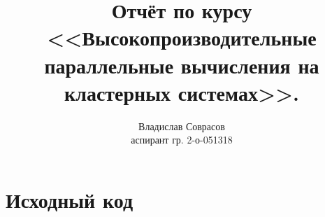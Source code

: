 \documentclass[a4paper]{article}
\begin{document}
\title{Отчёт по курсу <<Высокопроизводительные параллельные вычисления на кластерных системах>>.}
\author{Владислав Соврасов\\ аспирант гр. 2-о-051318}
\date{}
\maketitle

\section{}

\section{Исходный код}
%
\end{document}
